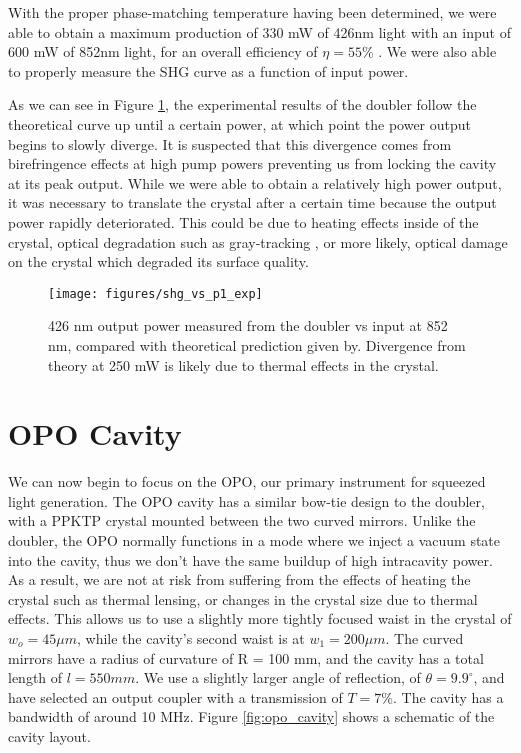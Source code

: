 With the proper phase-matching temperature having been determined, we were able
to obtain a maximum production of 330 mW of 426nm light with an input of 600 mW
of 852nm light, for an overall efficiency of $\eta = 55\%$ \cite{villa2007}. We
were also able to properly measure the SHG curve as a function of input power.     

As we can see in Figure \ref{fig:doubler_p2_vs_p1}, the experimental results of the doubler follow the theoretical curve up until a certain power, at which point the power output begins to slowly diverge.  It is suspected that this divergence comes from birefringence effects at high pump powers preventing us from locking the cavity at its peak output.  While we were able to obtain a relatively high power output, it was necessary to translate the crystal after a certain time because the output power rapidly deteriorated.  This could be due to heating effects inside of the crystal, optical degradation such as gray-tracking \cite{Boulanger00}, or more likely, optical damage on the crystal which degraded its surface quality.

\begin{figure}[ht] 
 \centering 
 \texttt{[image: figures/shg\_vs\_p1\_exp]} 
 \caption[SHG output vs. fundamental input]{426 nm output power measured from the doubler vs input at 852 nm, compared with theoretical prediction given by.  Divergence from theory at 250 mW is likely due to thermal effects in the crystal.} 
 \label{fig:doubler_p2_vs_p1} 
\end{figure}


\section{OPO Cavity}
\label{opo_cavity} 

We can now begin to focus on the OPO, our primary instrument for squeezed light generation.  The OPO cavity has a similar bow-tie design to the doubler, with a PPKTP crystal mounted between the two curved mirrors.  Unlike the doubler, the OPO normally functions in a mode where we inject a vacuum state into the cavity, thus we don't have the same buildup of high intracavity power.  As a result, we are not at risk from suffering from the effects of heating the crystal such as thermal lensing, or changes in the crystal size due to thermal effects.  This allows us to use a slightly more tightly focused waist in the crystal of $w_o = 45 \mu m$, while the cavity's second waist is at $w_1 = 200 \mu m$.  The curved mirrors have a radius of curvature of R = 100 mm, and the cavity has a total length of $l = 550 mm$.  We use a slightly larger angle of reflection, of $\theta=9.9^\circ$, and have selected an output coupler with a transmission of $T=7\%$.  The cavity has a bandwidth of around 10 MHz.  Figure \ref{fig:opo_cavity} shows a schematic of the cavity layout.


